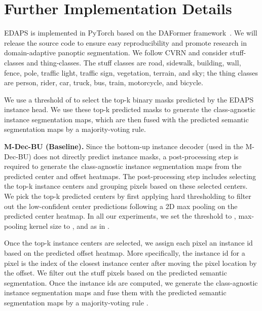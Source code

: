 \documentclass[10pt,twocolumn,letterpaper]{article}
\begin{document}
\section{Further Implementation Details}
\label{sec:further_impl_details}
EDAPS is implemented in PyTorch \cite{paszke2017automatic} based on the DAFormer framework~\cite{hoyer2021daformer}.
We will release the source code to ensure easy reproducibility and promote research in domain-adaptive panoptic segmentation.
We follow CVRN \cite{huang2021cross} and consider  stuff-classes and  thing-classes.
The stuff classes are road, sidewalk, building, wall, fence, pole, traffic light, traffic sign, vegetation, terrain, and sky;
the thing classes are person, rider, car, truck, bus, train, motorcycle, and bicycle. 

We use a threshold of  to select the top-k binary masks predicted by the EDAPS instance head.
We use these top-k predicted masks to generate the class-agnostic instance segmentation maps, which are then fused with the predicted semantic segmentation maps by a majority-voting rule.

\textbf{M-Dec-BU (Baseline).}
Since the bottom-up instance decoder (used in the M-Dec-BU) does not directly predict instance masks,
a post-processing step is required to generate the class-agnostic instance segmentation maps 
from the predicted center and offset heatmaps. 
The post-processing step includes selecting the top-k instance centers and
grouping pixels based on these selected centers.
We pick the top-k predicted centers by first applying hard thresholding to filter out the low-confident center predictions following a 2D max pooling on the predicted center heatmap.
In all our experiments, 
we set the threshold to ,
max-pooling kernel size to ,
and  as in \cite{cheng2019panoptic}.

Once the top-k instance centers are selected, 
we assign each pixel an instance id based on the predicted offset heatmap. 
More specifically, the instance id for a pixel is the index of the closest instance center 
after moving the pixel location by the offset.
We filter out the stuff pixels based on the predicted semantic segmentation.
Once the instance ids are computed, 
we generate the class-agnostic instance segmentation maps and 
fuse them with the predicted semantic segmentation maps by a majority-voting rule \cite{cheng2019panoptic}.
\end{document}
